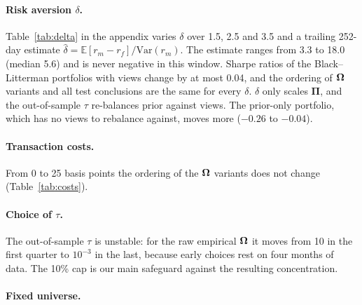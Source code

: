 \paragraph{Risk aversion $\delta$.} Table~\ref{tab:delta} in the appendix varies $\delta$ over 1.5, 2.5 and 3.5 and a trailing 252-day estimate $\hat\delta = \mathbb{E}[r_m - r_f]/\mathrm{Var}(r_m)$. The estimate ranges from 3.3 to 18.0 (median 5.6) and is never negative in this window. Sharpe ratios of the Black--Litterman portfolios with views change by at most 0.04, and the ordering of $\bm{\Omega}$ variants and all test conclusions are the same for every $\delta$. $\delta$ only scales $\bm{\Pi}$, and the out-of-sample $\tau$ re-balances prior against views. The prior-only portfolio, which has no views to rebalance against, moves more ($-0.26$ to $-0.04$).

\paragraph{Transaction costs.} From 0 to 25 basis points the ordering of the $\bm{\Omega}$ variants does not change (Table~\ref{tab:costs}).

\paragraph{Choice of $\tau$.} The out-of-sample $\tau$ is unstable: for the raw empirical $\bm{\Omega}$ it moves from 10 in the first quarter to $10^{-3}$ in the last, because early choices rest on four months of data. The 10\% cap is our main safeguard against the resulting concentration. 

\paragraph{Fixed universe.} 
